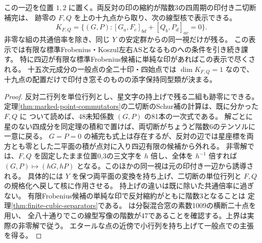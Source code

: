 \begin{theorem}\label{thm:nineteen-point-linear-companion}
この一辺を位置 $1,2$ に置く。両反対の印の縮約が階数3の四周期の印付き二切断補完は、
跡零の $F,Q$ を上の十九点から取り、次の線型核で表示できる。
\[
 K_{F,Q}=\{(G,P):[G_a,F_c]_{bd}+[Q_b,P_d]_{ac}=0\}.
\]
非零な組の共通倍率を除き、同じ $Y$ の安定群からの同一視だけが残る。
この表示では有限な標準Frobenius・Koszul左右ASとなるものへの条件を引き続き課す。
特に四辺が有限な標準Frobenius候補に単純な印があればこの表示で尽くされる。
十五次元成分の一般点の全二十印・四始点では $\dim K_{F,Q}=1$ なので、
十九点の配置だけで印付き窓そのものの添字保持同型類が決まる。
\end{theorem}
\begin{proof}
反対二行列を単位行列とし、星文字の持上げで残る二組も跡零にできる。
定理\ref{thm:marked-point-commutators}の二切断のSchur補の計算は、既に分かった $F,Q$ に
ついて読めば、48未知係数 $(G,P)$ の81本の一次式である。
解ごとに星のない四成分を同定理の積和で置けば、両切断がちょうど階数6のテンソルに一意に戻る。
$G=P=0$ の補完も式上は存在するが、反対の辺では星座標を両方とも零とした二平面の積が点対に入り四辺有限の候補から外れる。
非零解では、$F,Q$ を固定したまま位置0,3の三文字を $h$ 倍し、全体を $h^{-1}$ 倍すれば
$(G,P)\mapsto(hG,hP)$ となる。このほかの同一視は元の印付き一辺から誘導される。
具体的には $Y$ を保つ両平面の変換を持ち上げ、二切断の単位行列と $F,Q$ の規格化へ戻して核に作用させる。
持上げの違いは既に除いた共通倍率に過ぎない。
有限Frobenius候補の単純な印で反対縮約がともに階数3となることは
定理\ref{thm:finite-cubic-separators}である。
 は分裂混合窓の素数1009の横断二十点を用い、
全八十通りでこの線型写像の階数が47であることを確認する。上界は実際の非零解で従う。
エタールな点の近傍で小行列を持ち上げて一般点での主張を得る。
\end{proof}
